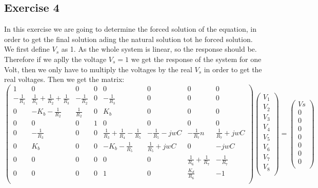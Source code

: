 \subsection{Exercise 4}
In this exercise we are going to determine the forced solution of the equation, in order to get the final solution ading the natural solution tot he forced solution. We first define $V_s$ as 1. As the whole system is linear, so the response should be. Therefore if we aplly the voltage $V_s=1$ we get the response of the system for one Volt, then we only have to multiply the voltages by the real $V_s$ in order to get the real voltages.
Then we get the matrix:
\begin{equation}
  \begin{pmatrix}
    1 & 0 & 0 & 0 & 0 & 0 & 0 & 0 \\
    -\frac{1}{R_1} & \frac{1}{R_1}+\frac{1}{R_2}+\frac{1}{R_3} & -\frac{1}{R_2} & 0 & -\frac{1}{R_3} & 0 & 0 & 0 \\
    0 & -K_b-\frac{1}{R_2} & \frac{1}{R_2} & 0 & K_b & 0 & 0 & 0 \\
    0 & 0 & 0 & 1 & 0 & 0 & 0 & 0 \\
    0 & -\frac{1}{R_3} & 0 & 0 & \frac{1}{R_3}+\frac{1}{R_4}-\frac{1}{R_5}  & -\frac{1}{R_5}-jwC & -\frac{1}{R_7}n & \frac{1}{R_7}+jwC \\
    0 & K_b & 0 & 0 & -K_b-\frac{1}{R_5} & \frac{1}{R_5}+jwC & 0 & -jwC \\
    0 & 0 & 0 & 0 & 0 & 0 & \frac{1}{R_6}+\frac{1}{R_7} & -\frac{1}{R_7} \\
    0 & 0 & 0 & 0 & 1 & 0 & \frac{K_d}{R_6} & -1 \\
  \end{pmatrix}
  \begin{pmatrix}
    V_1  \\
    V_2  \\
    V_3  \\
    V_4  \\
    V_5  \\
    V_6  \\
    V_7  \\
    V_8  \\
  \end{pmatrix}
  =
  \begin{pmatrix}
    Vs  \\
    0   \\
    0   \\
    0   \\
    0   \\
    0  \\
    0   \\
    0   \\
  \end{pmatrix}
  \label{eq:Exercise4LinearSystem}
\end{equation}

